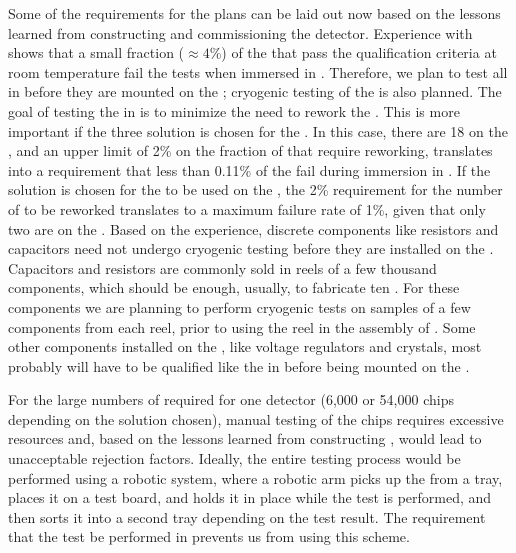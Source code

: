 Some of the requirements for the  plans can
be laid out now based on the lessons learned
from constructing and commissioning the 
detector. Experience with  shows that a small fraction
($\approx4$\%) of the   that pass the
qualification criteria at room temperature fail the tests
when immersed in \lntwo. Therefore, we plan to test all  in \lntwo
before they are mounted on the ; 
cryogenic testing of the  is also planned. The goal of testing 
the  in \lntwo is to minimize the need
to rework the . This is more important if 
the three  solution is chosen for the
. In this case, there are 18  on the
, and an upper limit of 2\% on the fraction of
 that require reworking, translates into a requirement 
that less than 0.11\% of the  fail during immersion in \lntwo.
If the  solution is chosen for the 
to be used on the , the 2\% requirement for the
number of  to be reworked translates to a 
maximum failure rate of 1\%, given that only two
 are on the . Based on the 
experience, discrete components like resistors and capacitors
need not undergo cryogenic testing before they are installed
on the . Capacitors and resistors are commonly
sold in reels of a few thousand components, which
should be enough, usually, to fabricate ten
. For these components we are planning to
perform cryogenic tests on samples of a few components
from each reel, prior to using the reel in the assembly of
. Some other components installed on
the , like voltage regulators and crystals, most probably will have to be qualified like the 
in \lntwo before being mounted on the .

For the large numbers of
 required for one   detector
(6,000 or 54,000 chips depending on the  solution
chosen), manual testing of the chips requires excessive 
resources and, based on the lessons learned from  
constructing  , would lead to unacceptable rejection
factors. Ideally, the entire testing
process would be performed using a robotic system, where 
a robotic arm picks up the  from a tray, places
it on a test board, and holds it in place while the test
is performed, and then sorts it into a second tray
depending on the test result. The requirement that the test
be performed in \lntwo prevents us from using this
scheme. 

